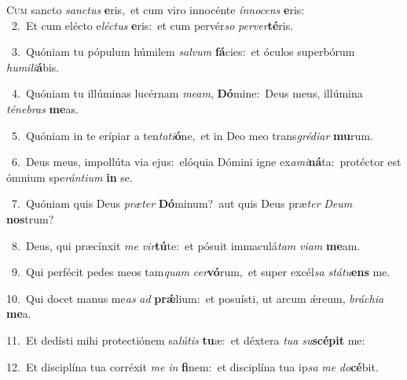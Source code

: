 \lettrine{\initial\textcolor{\initialcolor}{C}}{um} sancto \textit{sanc}\-\textit{tus} \textbf{e}\-ris,~\star et cum viro innocénte \textit{ín}\-\textit{no}\textit{cens} \textbf{e}\-ris:\\
{\numbfont\textcolor{\numbcolor}{~2.}}~Et cum elécto e\-\textit{léc}\-\textit{tus} \textbf{e}\-ris:~\star et cum pervér\textit{so} \textit{per}\-\textit{ver}\textbf{té}ris.\par
{\numbfont\textcolor{\numbcolor}{~3.}}~Quóniam tu pópulum húmilem \textit{sal}\-\textit{vum} \textbf{fá}\-cies:~\star et óculos superbórum \textit{hu}\-\textit{mi}\textit{li}\textbf{á}bis.\par
{\numbfont\textcolor{\numbcolor}{~4.}}~Quóniam tu illúminas lucérnam \textit{me}\-\textit{am}, \textbf{Dó}\-mine:~\star Deus meus, illúmina \textit{té}\-\textit{ne}\textit{bras} \textbf{me}\-as.\par
{\numbfont\textcolor{\numbcolor}{~5.}}~Quóniam in te erípiar a ten\-\textit{ta}\-\textit{ti}\textbf{ó}ne,~\star et in Deo meo trans\-\textit{gré}\-\textit{di}\textit{ar} \textbf{mu}\-rum.\par
{\numbfont\textcolor{\numbcolor}{~6.}}~Deus meus, impollúta via ejus:~\dagger elóquia Dómini igne ex\-\textit{a}\-\textit{mi}\textbf{ná}ta:~\star protéctor est ómnium spe\-\textit{rán}\-\textit{ti}\textit{um} \textbf{in} se.\par
{\numbfont\textcolor{\numbcolor}{~7.}}~Quóniam quis Deus \textit{præ}\-\textit{ter} \textbf{Dó}\-minum?~\star aut quis Deus præ\textit{ter} \textit{De}\-\textit{um} \textbf{nos}\-trum?\par
{\numbfont\textcolor{\numbcolor}{~8.}}~Deus, qui præcínxit \textit{me} \textit{vir}\-\textbf{tú}te:~\star et pósuit immaculá\textit{tam} \textit{vi}\-\textit{am} \textbf{me}\-am.\par
{\numbfont\textcolor{\numbcolor}{~9.}}~Qui perfécit pedes meos tam\textit{quam} \textit{cer}\-\textbf{vó}rum,~\star et super excél\textit{sa} \textit{stá}\-\textit{tu}\textbf{ens} me.\par
{\numbfont\textcolor{\numbcolor}{10.}}~Qui docet manus me\textit{as} \textit{ad} \textbf{prǽ}\-lium:~\star et posuísti, ut arcum ǽreum, \textit{brá}\-\textit{chi}\textit{a} \textbf{me}\-a.\par
{\numbfont\textcolor{\numbcolor}{11.}}~Et dedísti mihi protectiónem sa\-\textit{lú}\-\textit{tis} \textbf{tu}\-æ:~\star et déxtera \textit{tu}\-\textit{a} \textit{su}\-\textbf{scé}\textbf{pit} me:\par
{\numbfont\textcolor{\numbcolor}{12.}}~Et disciplína tua corréxit \textit{me} \textit{in} \textbf{fi}\-nem:~\star et disciplína tua ip\textit{sa} \textit{me} \textit{do}\-\textbf{cé}bit.\par
